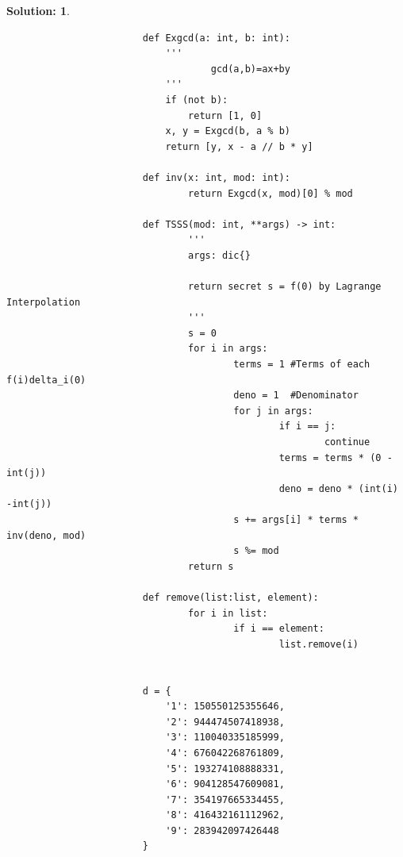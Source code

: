 \documentclass{article}
\theoremstyle{break}
\newtheorem*{solution*}{\textbf{Solution:} }
\begin{document}
\begin{enumerate}
\begin{solution*}
\begin{lstlisting}
                        def Exgcd(a: int, b: int):
                            '''
                                    gcd(a,b)=ax+by
                            '''
                            if (not b):
                                return [1, 0]
                            x, y = Exgcd(b, a % b)
                            return [y, x - a // b * y]
                        
                        def inv(x: int, mod: int):
                                return Exgcd(x, mod)[0] % mod
                        
                        def TSSS(mod: int, **args) -> int:
                                '''
                                args: dic{}
                        
                                return secret s = f(0) by Lagrange Interpolation
                                '''
                                s = 0
                                for i in args:
                                        terms = 1 #Terms of each f(i)delta_i(0)
                                        deno = 1  #Denominator
                                        for j in args:
                                                if i == j:
                                                        continue
                                                terms = terms * (0 - int(j))
                                                deno = deno * (int(i) -int(j))
                                        s += args[i] * terms * inv(deno, mod)
                                        s %= mod
                                return s
                        
                        def remove(list:list, element):
                                for i in list:
                                        if i == element:
                                                list.remove(i)
                        
                        
                        d = {
                            '1': 150550125355646,
                            '2': 944474507418938,
                            '3': 110040335185999,
                            '4': 676042268761809,
                            '5': 193274108888331,
                            '6': 904128547609081,
                            '7': 354197665334455,
                            '8': 416432161112962,
                            '9': 283942097426448
                        }
                        

\end{lstlisting}
\end{solution*}
\end{enumerate}
\end{document}
